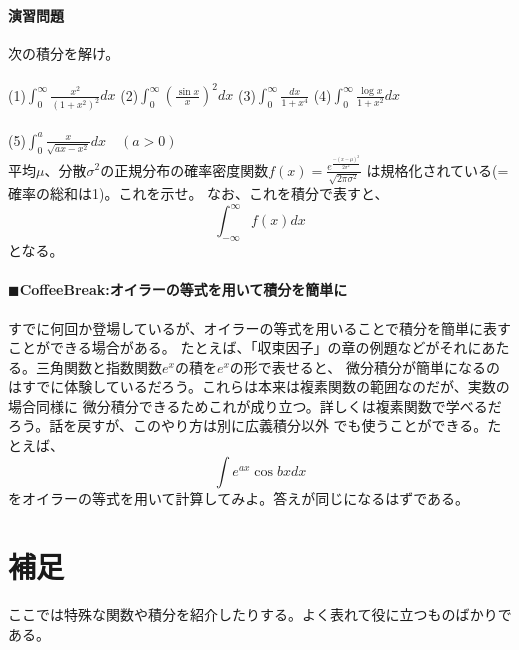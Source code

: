 \documentclass[a4j,dvipdfmx]{jsarticle}
\begin{document}
\subsection{演習問題}
次の積分を解け。\\\\
(1)$\displaystyle \int_0^\infty \frac{x^2}{(1+x^2)^2}dx$
\hspace{15mm}
(2)$\displaystyle \int_0^\infty \left(\frac{\sin x}{x}\right)^2 dx$
\hspace{15mm}
(3)$\displaystyle \int_0^\infty \frac{dx}{1+x^4}$
\hspace{15mm}
(4)$\displaystyle \int_0^\infty \frac{\log x}{1+x^2}dx$
\\\\
(5)$\displaystyle \int_0^a \frac{x}{\sqrt{ax-x^2}}dx\quad(a>0)$
\\

平均$\mu$、分散$\sigma^2$の正規分布の確率密度関数$\displaystyle f(x)=\frac{e^{\frac{-(x-\mu)^2}{2\sigma^2}}}{\sqrt{2\pi\sigma^2}}$ は規格化されている(=確率の総和は1)。これを示せ。
なお、これを積分で表すと、
\begin{equation*}
    \int_{-\infty}^{\infty}f(x)dx
\end{equation*}
となる。\\
\hrulefill
\subsection{$\blacksquare$CoffeeBreak:オイラーの等式を用いて積分を簡単に}
\begin{screen}
    すでに何回か登場しているが、オイラーの等式を用いることで積分を簡単に表すことができる場合がある。
    たとえば、「収束因子」の章の例題などがそれにあたる。三角関数と指数関数$e^x$の積を$e^{x}$の形で表せると、
    微分積分が簡単になるのはすでに体験しているだろう。これらは本来は複素関数の範囲なのだが、実数の場合同様に
    微分積分できるためこれが成り立つ。詳しくは複素関数で学べるだろう。話を戻すが、このやり方は別に広義積分以外
    でも使うことができる。たとえば、
    \begin{equation*}
        \int e^{ax} \cos bx dx
    \end{equation*}
    をオイラーの等式を用いて計算してみよ。答えが同じになるはずである。
\end{screen}
\newpage
\part{補足}
ここでは特殊な関数や積分を紹介したりする。よく表れて役に立つものばかりである。
\end{document}
